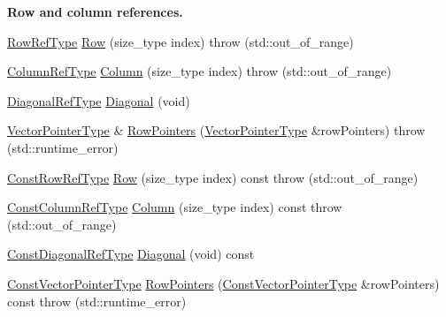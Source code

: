 \begin{Indent}{\bf Row and column references.}\par
\begin{DoxyCompactItemize}
\item 
\hyperlink{classvct_dynamic_const_matrix_base_a15b845e745a76559d730ecef10a991b7}{Row\-Ref\-Type} \hyperlink{classvct_dynamic_matrix_base_adb64c6d6c8f9b9d4aafb2d9c6a49cf4a}{Row} (size\-\_\-type index)  throw (std\-::out\-\_\-of\-\_\-range)
\item 
\hyperlink{classvct_dynamic_const_matrix_base_a232026578d12a51aa5228dee998b5663}{Column\-Ref\-Type} \hyperlink{classvct_dynamic_matrix_base_ac4911101f666e7cd410180e8c4ee2a70}{Column} (size\-\_\-type index)  throw (std\-::out\-\_\-of\-\_\-range)
\item 
\hyperlink{classvct_dynamic_const_matrix_base_a2773e894d2ce8aa7a479eeecc535ac33}{Diagonal\-Ref\-Type} \hyperlink{classvct_dynamic_matrix_base_a104a9164f09eee0e18a107a417021ae9}{Diagonal} (void)
\item 
\hyperlink{classvct_dynamic_const_matrix_base_aa3fdaf7217ea2667db03af719c3371c4}{Vector\-Pointer\-Type} \& \hyperlink{classvct_dynamic_matrix_base_a89086ef2a61ef8ba4f5ee1ec084c1581}{Row\-Pointers} (\hyperlink{classvct_dynamic_const_matrix_base_aa3fdaf7217ea2667db03af719c3371c4}{Vector\-Pointer\-Type} \&row\-Pointers)  throw (std\-::runtime\-\_\-error)
\item 
\hyperlink{classvct_dynamic_const_matrix_base_a42a300cb1afd5f0602ba5c2d7d9cc40b}{Const\-Row\-Ref\-Type} \hyperlink{classvct_dynamic_matrix_base_a951f9d281652ded8c7a7f295a05321fe}{Row} (size\-\_\-type index) const   throw (std\-::out\-\_\-of\-\_\-range)
\item 
\hyperlink{classvct_dynamic_const_matrix_base_ac8caf37f979246b1ae99d6e6876879e0}{Const\-Column\-Ref\-Type} \hyperlink{classvct_dynamic_matrix_base_a33bda20e269dd7e9e55da3a5dbf0fe58}{Column} (size\-\_\-type index) const   throw (std\-::out\-\_\-of\-\_\-range)
\item 
\hyperlink{classvct_dynamic_const_matrix_base_aa497314340719c9e70a4991d3f306d7e}{Const\-Diagonal\-Ref\-Type} \hyperlink{classvct_dynamic_matrix_base_a7a871918a880bb3dd95fa333b97c8774}{Diagonal} (void) const 
\item 
\hyperlink{classvct_dynamic_const_matrix_base_ae4eb1369d9d05fdf98786c5583834e73}{Const\-Vector\-Pointer\-Type} \hyperlink{classvct_dynamic_matrix_base_a08e9785b34adc674e05036f90943c883}{Row\-Pointers} (\hyperlink{classvct_dynamic_const_matrix_base_ae4eb1369d9d05fdf98786c5583834e73}{Const\-Vector\-Pointer\-Type} \&row\-Pointers) const   throw (std\-::runtime\-\_\-error)
\end{DoxyCompactItemize}
\end{Indent}
